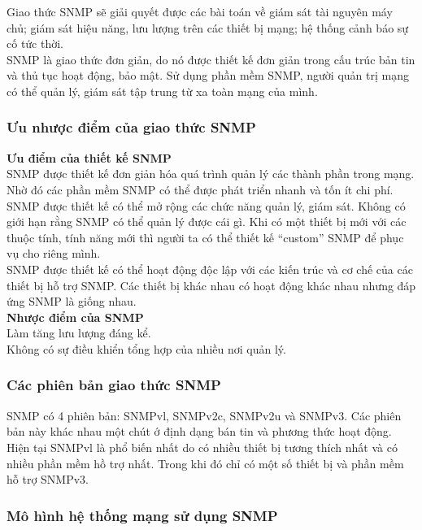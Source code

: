 \documentclass[12pt,oneside,a4paper]{article}
\begin{document}
Giao thức SNMP sẽ giải quyết được các bài toán về giám sát tài nguyên máy chủ; giám sát hiệu năng, lưu lượng trên các thiết bị mạng; hệ thống cảnh báo sự cố tức thời.\\

SNMP là giao thức đơn giản, do nó được thiết kế đơn giản trong cấu trúc bản tin và thủ tục hoạt động, bảo mật. Sử dụng phần mềm SNMP, người quản trị mạng có thể quản lý, giám sát tập trung từ xa toàn mạng của mình.
\subsubsection{Ưu nhược điểm của giao thức SNMP}
\textbf{Ưu điểm của thiết kế SNMP}\\

SNMP được thiết kế đơn giản hóa quá trình quản lý các thành phần trong mạng. Nhờ đó các phần mềm SNMP có thể được phát triển nhanh và tốn ít chi phí.\\

SNMP được thiết kế có thể mở rộng các chức năng quản lý, giám sát. Không có giới hạn rằng SNMP có thể quản lý được cái gì. Khi có một thiết bị mới với các thuộc tính, tính năng mới thì người ta có thể thiết kế “custom” SNMP để phục vụ cho riêng mình.\\

SNMP được thiết kế có thể hoạt động độc lập với các kiến trúc và cơ chế của các thiết bị hỗ trợ SNMP. Các thiết bị khác nhau có hoạt động khác nhau nhưng đáp ứng SNMP là giống nhau.\\

\textbf{Nhược điểm của SNMP}\\

Làm tăng lưu lượng đáng kể.\\

Không có sự điều khiển tổng hợp của nhiều nơi quản lý.\\
\subsubsection{Các phiên bản giao thức SNMP}
SNMP có 4 phiên bản: SNMPvl, SNMPv2c, SNMPv2u và SNMPv3. Các phiên bản này khác nhau một chút ớ định dạng bán tin và phương thức hoạt động. Hiện tại SNMPvl là phổ biến nhất do có nhiều thiết bị tương thích nhất và có nhiều phần mềm hồ trợ nhất. Trong khi đó chỉ có một số thiết bị và phần mềm hỗ trợ SNMPv3. 
\subsubsection{Mô hình hệ thống mạng sử dụng SNMP}
\end{document}
